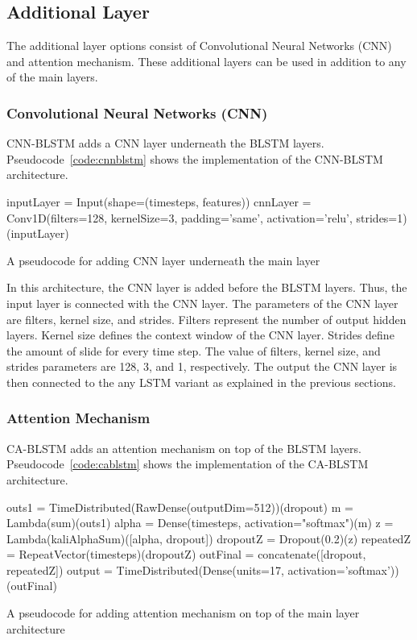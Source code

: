 \subsection{Additional Layer}
The additional layer options consist of Convolutional Neural Networks (CNN) and attention mechanism. These additional layers can be used in addition to any of the main layers.

\subsubsection{Convolutional Neural Networks (CNN)}
CNN-BLSTM adds a CNN layer underneath the BLSTM layers. Pseudocode~\ref{code:cnnblstm} shows the implementation of the CNN-BLSTM architecture.
\begin{kode}
	inputLayer = Input(shape=(timesteps, features))\;
	cnnLayer = Conv1D(filters=128, kernelSize=3, padding='same', activation='relu', strides=1)(inputLayer)\;
	\caption{A pseudocode for adding CNN layer underneath the main layer}
	\label{code:cnnblstm}
\end{kode}

In this architecture, the CNN layer is added before the BLSTM layers. Thus, the input layer is connected with the CNN layer. The parameters of the CNN layer are filters, kernel size, and strides. Filters represent the number of output hidden layers. Kernel size defines the context window of the CNN layer. Strides define the amount of slide for every time step. The value of filters, kernel size, and strides parameters are 128, 3, and 1, respectively. The output the CNN layer is then connected to the any LSTM variant as explained in the previous sections.

\subsubsection{Attention Mechanism}
CA-BLSTM adds an attention mechanism on top of the BLSTM layers. Pseudocode~\ref{code:cablstm} shows the implementation of the CA-BLSTM architecture.
\begin{kode}
	outs1 = TimeDistributed(RawDense(outputDim=512))(dropout)\;
	m = Lambda(sum)(outs1)\;
	alpha = Dense(timesteps, activation="softmax")(m)\;
	z = Lambda(kaliAlphaSum)([alpha, dropout])\;
	dropoutZ = Dropout(0.2)(z)\;
	repeatedZ = RepeatVector(timesteps)(dropoutZ)\;
	outFinal = concatenate([dropout, repeatedZ])\;	
	output = TimeDistributed(Dense(units=17, activation='softmax'))(outFinal)\;
	
	\caption{A pseudocode for adding attention mechanism on top of the main layer architecture}
	\label{code:cablstm}
\end{kode}

